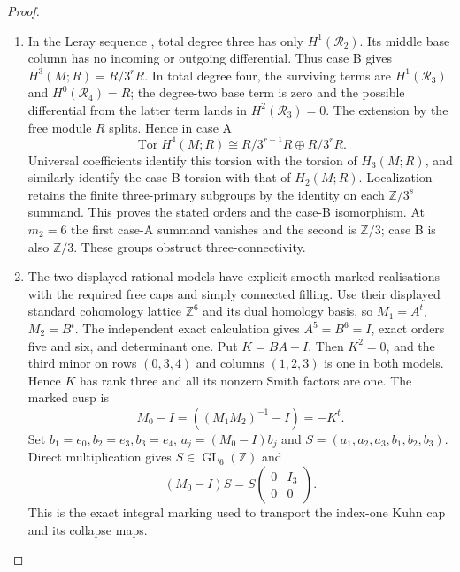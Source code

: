 \begin{proof}
\begin{enumerate}[label={$\langle1\rangle$\arabic*.}]
For $q=2,3$ there is consequently an exact sequence
\[
 0\longrightarrow\mathcal R_q\longrightarrow j_*L_q
 \longrightarrow Q_q\longrightarrow0,
\]
where $Q_q$ is supported at the second finite point.  Since
$H^0(j_*L_q)=0$, its connecting map embeds $Q_q$ in
$H^1(\mathcal R_q)$, with the free quotient $H^1(j_*L_q)$
computed above.  Its torsion is exactly $Q_q$.
Also $H^2(\mathcal R_1)=H^2(\mathcal R_2)=H^2(\mathcal R_3)=0$.
Injectivity gives $H^0(\mathcal R_3)=0$.  The degree-four
free cusp kernel, together with $H^0(j_*L_4)=0$, gives
$H^0(\mathcal R_4)=R$.

\item In the Leray sequence
\cite[Tag~01F2, Lemma~20.13.4]{StacksProject}, total degree three
has only $H^1(\mathcal R_2)$.  Its middle base column has no
incoming or outgoing differential.  Thus case B gives
$H^3(M;R)=R/3^rR$.
In total degree four, the surviving terms are
$H^1(\mathcal R_3)$ and $H^0(\mathcal R_4)=R$;
the degree-two base term is zero and the possible differential
from the latter term lands in $H^2(\mathcal R_3)=0$.
The extension by the free module $R$ splits.  Hence in case A
\[
 \operatorname{Tor}H^4(M;R)
   \cong R/3^{r-1}R\oplus R/3^rR.
\]
Universal coefficients
\cite[Theorem~3.2, p.~195]{Hatcher2002} identify this torsion
with the torsion of $H_3(M;R)$, and similarly identify the
case-B torsion with that of $H_2(M;R)$.  Localization retains
the finite three-primary subgroups by the identity on each
$\mathbb Z/3^s$ summand.  This proves the stated orders and
the case-B isomorphism.  At $m_2=6$ the first case-A summand
vanishes and the second is $\mathbb Z/3$; case B is also
$\mathbb Z/3$.  These groups obstruct three-connectivity.
\item The two displayed rational models have explicit smooth marked
realisations with the required free caps and simply connected filling.
Use their displayed standard cohomology lattice $\mathbb Z^6$ and its
dual homology basis, so $M_1=A^t$, $M_2=B^t$.
The independent exact calculation gives $A^5=B^6=I$, exact orders five
and six, and determinant one. Put $K=BA-I$. Then $K^2=0$, and the
third minor on rows $(0,3,4)$ and columns $(1,2,3)$ is one in both
models. Hence $K$ has rank three and all its nonzero Smith factors
are one. The marked cusp is
\[
 M_0-I=((M_1M_2)^{-1}-I)=-K^t.
\]
Set $b_1=e_0,b_2=e_3,b_3=e_4$, $a_j=(M_0-I)b_j$ and
$S=(a_1,a_2,a_3,b_1,b_2,b_3)$. Direct multiplication gives
$S\in\operatorname{GL}_6(\mathbb Z)$ and
\[
 (M_0-I)S=S\begin{pmatrix}0&I_3\\0&0\end{pmatrix}.
\]
This is the exact integral marking used to transport the index-one
Kuhn cap and its collapse maps.


\end{enumerate}
\end{proof}
